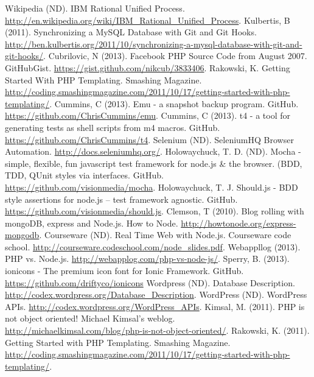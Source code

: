 \newpage
\begin{thebibliography}{9}
 Wikipedia (ND). IBM Rational Unified Process.
  \url{http://en.wikipedia.org/wiki/IBM\_Rational\_Unified\_Process}.
 Kulbertis, B (2011). Synchronizing a MySQL Database with
  Git and Git
  Hooks. \url{http://ben.kulbertis.org/2011/10/synchronizing-a-mysql-database-with-git-and-git-hooks/}.
 Cubrilovic, N (2013). Facebook PHP Source Code from
  August 2007. GitHubGist. \url{https://gist.github.com/nikcub/3833406}.
 Rakowski, K. Getting Started With PHP
  Templating. Smashing
  Magazine. \url{http://coding.smashingmagazine.com/2011/10/17/getting-started-with-php-templating/}.
 Cummins, C (2013). Emu - a snapshot backup
  program. GitHub. \url{https://github.com/ChrisCummins/emu}.
 Cummins, C (2013). t4 - a tool for generating tests as
shell scripts from m4 macros. GitHub. \url{https://github.com/ChrisCummins/t4}.
 Selenium (ND). SeleniumHQ Browser
Automation. \url{http://docs.seleniumhq.org/}.
 Holowaychuck, T. D. (ND). Mocha - simple, flexible, fun
javascript test framework for node.js \& the browser. (BDD, TDD, QUnit styles
via interfaces. GitHub. \url{https://github.com/visionmedia/mocha}.
 Holowaychuck, T. J. Should.js - BDD style assertions
for node.js -- test framework
agnostic. GitHub. \url{https://github.com/visionmedia/should.js}.
 Clemson, T (2010). Blog rolling with mongoDB, express and
Node.js. How to Node. \url{http://howtonode.org/express-mongodb}.
 Courseware (ND). Real Time Web with Node.js. Courseware
code school. \url{http://courseware.codeschool.com/node_slides.pdf}.
 Webappllog (2013). PHP
vs. Node.js. \url{http://webapplog.com/php-vs-node-js/}.
 Sperry, B. (2013). ionicons - The premium icon font for
Ionic Framework. GitHub. \url{https://github.com/driftyco/ionicons}
 Wordpress (ND). Database
Description. \url{http://codex.wordpress.org/Database_Description}.
 WordPress (ND). WordPress
APIs. \url{http://codex.wordpress.org/WordPress_APIs}.
 Kimsal, M. (2011). PHP is not object oriented! Michael Kimsal's
weblog. \url{http://michaelkimsal.com/blog/php-is-not-object-oriented/}.
 Rakowski, K. (2011). Getting Started with PHP
Templating. Smashing Magazine.
\url{http://coding.smashingmagazine.com/2011/10/17/getting-started-with-php-templating/}.

\end{thebibliography}
